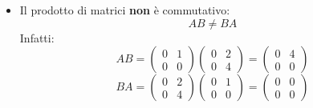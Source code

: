 \documentclass[a4paper]{article}
\theoremstyle{break}
\theoremstyle{break}
\theoremstyle{break}
\theoremstyle{break}
\begin{document}
\begin{itemize}
      \item Il prodotto di matrici \textbf{non} è commutativo:
        \[
        AB \neq BA
        \] 
        Infatti:
        \[
        AB = \begin{pmatrix} 
          0 & 1\\
          0 & 0
        \end{pmatrix}
        \begin{pmatrix} 
          0 & 2\\
          0 & 4
        \end{pmatrix} 
        =
        \begin{pmatrix} 
          0 & 4\\
          0 & 0
        \end{pmatrix} 
        \] 
        \[
        BA = \begin{pmatrix} 
          0 & 2\\
          0 & 4
        \end{pmatrix} 
        \begin{pmatrix} 
          0 & 1\\
          0 & 0
        \end{pmatrix} 
        =
        \begin{pmatrix} 
          0 & 0\\
          0 & 0
        \end{pmatrix} 
        \] 
\end{itemize}
\end{document}
